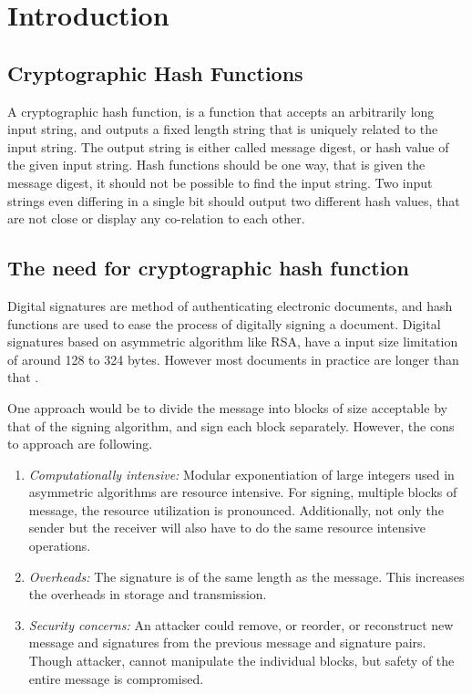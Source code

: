 \chapter{Introduction}

\section{Cryptographic Hash Functions}

A cryptographic hash function, is a function that accepts an arbitrarily long input string, and outputs
a fixed length string that is uniquely related to the input string. The output string is either called message
digest, or hash value of the given input string. Hash functions should be one way, that is given the message
digest, it should not be possible to find the input string. Two input strings even differing in a single
bit should output two different hash values, that are not close or display any co-relation to each other.

\section{The need for cryptographic hash function} 

Digital signatures are method of authenticating electronic documents, and hash functions are used to ease the
process of digitally signing a document. Digital signatures based on asymmetric algorithm like
RSA, have a input size limitation of around 128 to 324 bytes. However most documents in practice are
longer than that \cite{00017}.

One approach would be to divide the message into blocks of size acceptable by that of the signing 
algorithm, and sign each block separately. However, the cons to approach are following.

\begin{enumerate}
  \item \emph{Computationally intensive:} Modular exponentiation of large integers used in asymmetric
  algorithms are resource intensive. For signing, multiple blocks of message, the resource utilization
  is pronounced. Additionally, not only the sender but the receiver will also have to do the same resource
  intensive operations.
  \item \emph{Overheads:} The signature is of the same length as the message. This increases the overheads
  in storage and transmission.
  \item \emph{Security concerns:} An attacker could remove, or reorder, or reconstruct new message and 
  signatures from the previous message and signature pairs. Though attacker, cannot manipulate the individual
  blocks, but safety of the entire message is compromised.
\end{enumerate}

